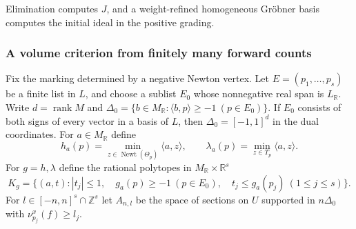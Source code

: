 \documentclass[11pt,reqno]{amsart}
\numberwithin{equation}{section}
\theoremstyle{definition}
\theoremstyle{remark}
\DeclareMathOperator{\Newt}{Newt}
\begin{document}
Elimination computes \(J\), and a weight-refined homogeneous
Gr\"obner basis computes the initial ideal in the positive grading.

\subsubsection{A volume criterion from finitely many forward counts}

Fix the marking determined by a negative Newton vertex. Let \(E=(p_1,\ldots,p_s)\) be a
finite list in \(L\), and choose a sublist \(E_0\) whose nonnegative
real span is \(L_{\mathbb R}\). Write \(d=\operatorname{rank}M\) and
\(\Delta_0=\{b\in M_{\mathbb R}:\langle b,p\rangle\ge-1\ (p\in E_0)\}\).
If \(E_0\) consists of both signs of every vector in a basis of \(L\),
then \(\Delta_0=[-1,1]^d\) in the dual coordinates.
For \(a\in M_{\mathbb R}\) define
\[ h_a(p)=\min_{z\in\Newt(\Theta_p)}\langle a,z\rangle,\qquad \lambda_a(p)=\min_{z\in T_p}\langle a,z\rangle. \]
For \(g=h,\lambda\) define the rational polytopes in \(M_{\mathbb R}\times\mathbb R^s\)
\[ K_g=\{(a,t): |t_j|\le1,\quad g_a(p)\ge-1\ (p\in E_0),\quad t_j\le g_a(p_j)\ (1\le j\le s)\}. \]
For \(l\in[-n,n]^s\cap\mathbb Z^s\) let \(A_{n,l}\) be the space of
sections on \(U\) supported in \(n\Delta_0\) with \(\nu_{p_j}^x(f)\ge l_j\).
\end{document}
